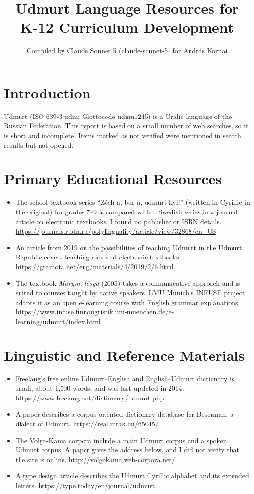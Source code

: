 \documentclass[12pt]{article}
\title{Udmurt Language Resources for K-12 Curriculum Development}
\author{Compiled by Claude Sonnet 5 (claude-sonnet-5) for Andr\'as Kornai}
\date{}
\begin{document}
\maketitle

\section{Introduction}
Udmurt (ISO 639-3 udm; Glottocode udmu1245) is a Uralic language of the Russian Federation. This report is based on a small number of web searches, so it is short and incomplete. Items marked as not verified were mentioned in search results but not opened.

\section{Primary Educational Resources}
\begin{itemize}
\item The school textbook series ``Z\v{e}ch-a, bur-a, udmurt kyl!'' (written in Cyrillic in the original) for grades 7--9 is compared with a Swedish series in a journal article on electronic textbooks. I found no publisher or ISBN details. \url{https://journals.rudn.ru/polylinguality/article/view/32868/en_US}
\item An article from 2019 on the possibilities of teaching Udmurt in the Udmurt Republic covers teaching aids and electronic textbooks. \url{https://gramota.net/eng/materials/4/2019/2/6.html}
\item The textbook \emph{Marym, l\'esya} (2005) takes a communicative approach and is suited to courses taught by native speakers. LMU Munich's INFUSE project adapts it as an open e-learning course with English grammar explanations. \url{https://www.infuse.finnougristik.uni-muenchen.de/e-learning/udmurt/index.html}
\end{itemize}

\section{Linguistic and Reference Materials}
\begin{itemize}
\item Freelang's free online Udmurt--English and English--Udmurt dictionary is small, about 1,500 words, and was last updated in 2014. \url{https://www.freelang.net/dictionary/udmurt.php}
\item A paper describes a corpus-oriented dictionary database for Beserman, a dialect of Udmurt. \url{https://real.mtak.hu/65045/}
\item The Volga-Kama corpora include a main Udmurt corpus and a spoken Udmurt corpus. A paper gives the address below, and I did not verify that the site is online. \url{http://volgakama.web-corpora.net/}
\item A type design article describes the Udmurt Cyrillic alphabet and its extended letters. \url{https://type.today/en/journal/udmurt}
\end{itemize}
\end{document}

